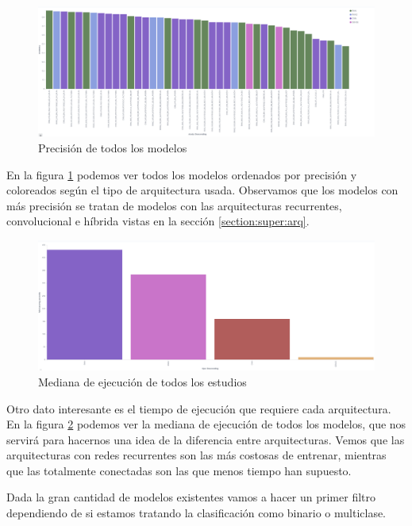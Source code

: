 \begin{figure}[!ht]
	\centering
	\includegraphics[width=1\textwidth]{images/super/resumen_todos}
	\caption{Precisión de todos los modelos}
	\label{fig:resumen_todos}
\end{figure}

En la figura \ref{fig:resumen_todos} podemos ver todos los modelos ordenados por precisión y coloreados según el tipo de arquitectura usada. Observamos que los modelos con más precisión se tratan de modelos con las arquitecturas recurrentes, convolucional e híbrida vistas en la sección \ref{section:super:arq}.



\begin{figure}[!ht]
	\centering
	\includegraphics[width=1\textwidth]{images/super/resumen_tiempo}
	\caption{Mediana de ejecución de todos los estudios}
	\label{fig:resumen_tiempo}
\end{figure}

Otro dato interesante es el tiempo de ejecución que requiere cada arquitectura. En la figura \ref{fig:resumen_tiempo} podemos ver la mediana de ejecución de todos los modelos, que nos servirá para hacernos una idea de la diferencia entre arquitecturas. Vemos que las arquitecturas con redes recurrentes son las más costosas de entrenar, mientras que las totalmente conectadas son las que menos tiempo han supuesto.



Dada la gran cantidad de modelos existentes vamos a hacer un primer filtro dependiendo de si estamos tratando la clasificación como binario o multiclase.

